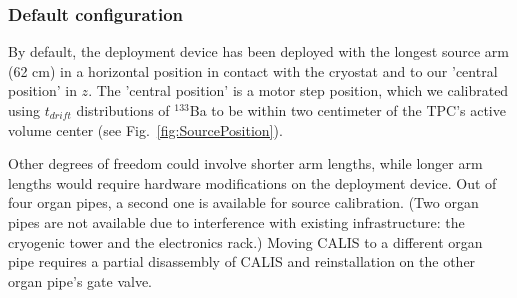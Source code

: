 
\subsubsection*{Default configuration}\label{sec:DefaultConfig}\label{sec:CentralPosition}
By default, the deployment device has been deployed with the longest source arm (62 cm) in a horizontal position in contact with the cryostat and to our 'central position' in $z$. The 'central position' is a motor step position, which we calibrated using $t_{drift}$ distributions of $^{133}$Ba to be within two centimeter of the TPC's active volume center (see Fig.~\ref{fig:SourcePosition}). 

Other degrees of freedom could involve shorter arm lengths, while longer arm lengths would require hardware modifications on the deployment device. Out of four organ pipes, a second one is available for source calibration. (Two organ pipes are not available due to interference with existing infrastructure: the cryogenic tower and the electronics rack.) Moving CALIS to a different organ pipe requires a partial disassembly of CALIS and reinstallation on the other organ pipe's gate valve.

